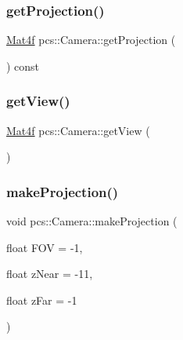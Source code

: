 \mbox{\label{classpcs_1_1Camera_a54785d1551fb6d273f77b6bcf806837b}} 
\subsubsection{\texorpdfstring{get\+Projection()}{getProjection()}}
{\footnotesize\ttfamily \hyperlink{structpcs_1_1Mat4f}{Mat4f} pcs\+::\+Camera\+::get\+Projection (\begin{DoxyParamCaption}{ }\end{DoxyParamCaption}) const\hspace{0.3cm}{\ttfamily [inline]}}

\mbox{\label{classpcs_1_1Camera_afb48cb746e7d789dc0395009fd0d03b5}} 
\subsubsection{\texorpdfstring{get\+View()}{getView()}}
{\footnotesize\ttfamily \hyperlink{structpcs_1_1Mat4f}{Mat4f} pcs\+::\+Camera\+::get\+View (\begin{DoxyParamCaption}{ }\end{DoxyParamCaption})}

\mbox{\label{classpcs_1_1Camera_a7595a6bbed4b3608cb264ff1a16b6516}} 
\subsubsection{\texorpdfstring{make\+Projection()}{makeProjection()}}
{\footnotesize\ttfamily void pcs\+::\+Camera\+::make\+Projection (\begin{DoxyParamCaption}\item[{float}]{F\+OV = {\ttfamily -\/1},  }\item[{float}]{z\+Near = {\ttfamily -\/11},  }\item[{float}]{z\+Far = {\ttfamily -\/1} }\end{DoxyParamCaption})}




